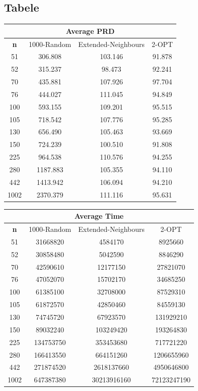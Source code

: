 \documentclass{article}
\begin{document}
\subsection{Tabele}
\begin{center}
\begin{tabular}{|c|c|c|c|}
\hline
\multicolumn{4}{|c|}{\textbf{Average PRD}}\\
\hline
\textbf{n} & 1000-Random & Extended-Neighbours & 2-OPT\\
\hline
51 & 306.808 & 103.146 & 91.878\\
\hline
52 & 315.237 & 98.473 & 92.241\\
\hline
70 & 435.881 & 107.926 & 97.704\\
\hline
76 & 444.027 & 111.045 & 94.849\\
\hline
100 & 593.155 & 109.201 & 95.515\\
\hline
105 & 718.542 & 107.776 & 95.285\\
\hline
130 & 656.490 & 105.463 & 93.669\\
\hline
150 & 724.239 & 100.510 & 91.808\\
\hline
225 & 964.538 & 110.576 & 94.255\\
\hline
280 & 1187.883 & 105.355 & 94.110\\
\hline
442 & 1413.942 & 106.094 & 94.210\\
\hline
1002 & 2370.379 & 111.116 & 95.631\\
\hline
\end{tabular}
\end{center}

\begin{center}
\begin{tabular}{|c|c|c|c|}
\hline
\multicolumn{4}{|c|}{\textbf{Average Time}}\\
\hline
\textbf{n} & 1000-Random & Extended-Neighbours & 2-OPT\\
\hline
51 & 31668820 & 4584170 & 8925660\\
\hline
52 & 30858480 & 5042590 & 8846290\\
\hline
70 & 42590610 & 12177150 & 27821070\\
\hline
76 & 47052070 & 15702170 & 34685250\\
\hline
100 & 61385100 & 32708000 & 87529310\\
\hline
105 & 61872570 & 42850460 & 84559130\\
\hline
130 & 74745720 & 67923570 & 131929210\\
\hline
150 & 89032240 & 103249420 & 193264830\\
\hline
225 & 134753750 & 353453680 & 717721220\\
\hline
280 & 166413550 & 664151260 & 1206655960\\
\hline
442 & 271874520 & 2618137660 & 4950646800\\
\hline
1002 & 647387380 & 30213916160 & 72123247190\\
\hline
\end{tabular}
\end{center}
\end{document}
